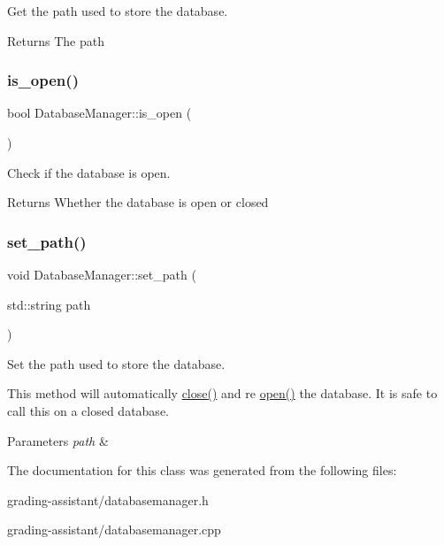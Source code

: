 Get the path used to store the database. 

\begin{DoxyReturn}{Returns}
The path 
\end{DoxyReturn}
\mbox{\label{class_database_manager_aa5d35a29bdad47e640622ac6e92efd82}} 
\subsubsection{\texorpdfstring{is\+\_\+open()}{is\_open()}}
{\footnotesize\ttfamily bool Database\+Manager\+::is\+\_\+open (\begin{DoxyParamCaption}{ }\end{DoxyParamCaption})}



Check if the database is open. 

\begin{DoxyReturn}{Returns}
Whether the database is open or closed 
\end{DoxyReturn}
\mbox{\label{class_database_manager_aa3d5f606c609705694a7ece8e31cd987}} 
\subsubsection{\texorpdfstring{set\+\_\+path()}{set\_path()}}
{\footnotesize\ttfamily void Database\+Manager\+::set\+\_\+path (\begin{DoxyParamCaption}\item[{std\+::string}]{path }\end{DoxyParamCaption})}



Set the path used to store the database. 

This method will automatically \hyperlink{class_database_manager_a36c8ab027e11aba2464f384b18e814e5}{close()} and re \hyperlink{class_database_manager_a6c583242d2a2971a285531886d08f377}{open()} the database. It is safe to call this on a closed database.


\begin{DoxyParams}{Parameters}
{\em path} & \\
\hline
\end{DoxyParams}


The documentation for this class was generated from the following files\+:\begin{DoxyCompactItemize}
\item 
grading-\/assistant/databasemanager.\+h\item 
grading-\/assistant/databasemanager.\+cpp\end{DoxyCompactItemize}
